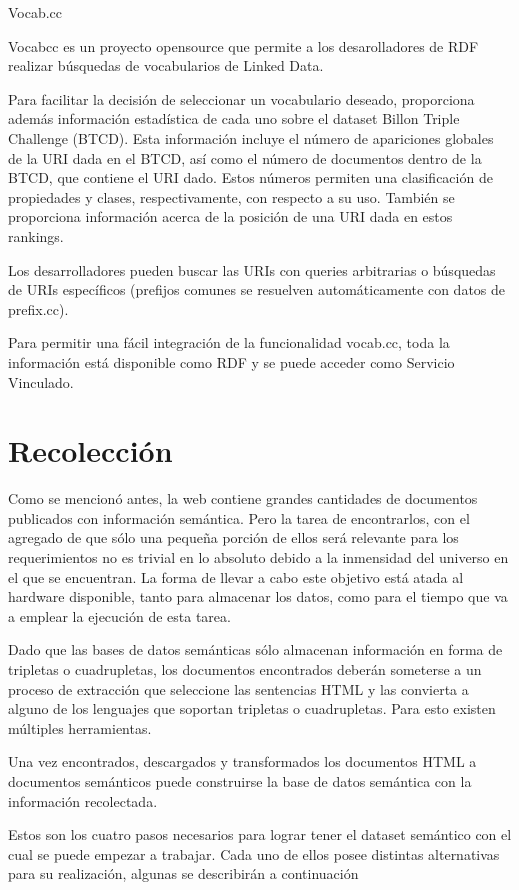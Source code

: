 Vocab.cc

Vocabcc es un proyecto opensource que permite a los desarolladores de RDF realizar búsquedas de vocabularios de Linked Data.

Para facilitar la decisión de seleccionar un vocabulario deseado, proporciona además información estadística de cada uno sobre el dataset Billon Triple Challenge (BTCD). 
 Esta información incluye el número de apariciones globales de la URI dada en el BTCD, así como el número de documentos dentro de la BTCD, que contiene el URI dado. Estos números permiten una clasificación de propiedades y clases, respectivamente, con respecto a su uso. También se proporciona información acerca de la posición de una URI dada en estos rankings.

Los desarrolladores pueden buscar las URIs con queries arbitrarias o búsquedas de URIs específicos (prefijos comunes se resuelven automáticamente con datos de prefix.cc).

Para permitir una fácil integración de la funcionalidad vocab.cc, toda la información está disponible como RDF y se puede acceder como Servicio Vinculado.

\section{Recolección}

%
Como se mencionó antes, la web contiene grandes cantidades de documentos publicados con información semántica. Pero la tarea
de encontrarlos, con el agregado de que sólo una pequeña porción de ellos será relevante para los requerimientos no es trivial
en lo absoluto debido a la inmensidad del universo en el que se encuentran. La forma de llevar a cabo este objetivo está 
atada al hardware disponible, tanto para almacenar los datos, como para el tiempo que va a emplear la ejecución de esta 
tarea.  

Dado que las bases de datos semánticas sólo almacenan información en forma de tripletas o cuadrupletas, los documentos encontrados 
deberán someterse a un proceso de extracción que seleccione las sentencias HTML y las convierta a alguno de los lenguajes que soportan  
tripletas o cuadrupletas. Para esto existen múltiples herramientas. 

Una vez encontrados, descargados y transformados los documentos HTML a documentos semánticos puede construirse la base de datos semántica 
con la información recolectada. 

Estos son los cuatro pasos necesarios para lograr tener el dataset semántico con el cual se puede empezar a trabajar. Cada uno de ellos 
posee distintas alternativas para su realización, algunas se describirán a continuación 


